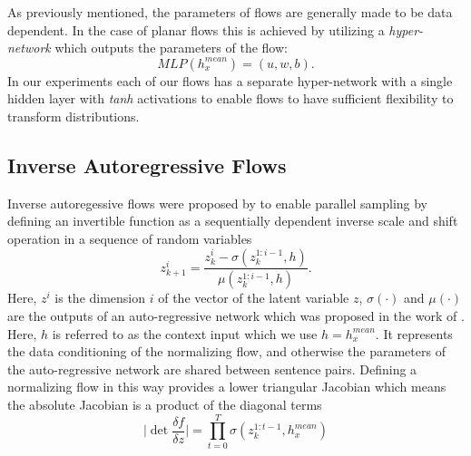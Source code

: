 

As previously mentioned, the parameters of flows are generally made to be data dependent. In the case of planar flows this is achieved by utilizing a \textit{hyper-network} \cite{ha2016hypernets} which outputs the parameters of the flow:
 \begin{equation}
 MLP(h^{mean}_{x}) = (u, w, b).
 \end{equation}
In our experiments each of our flows has a separate hyper-network with a single hidden layer with \textit{tanh} activations to enable flows to have sufficient flexibility to transform distributions.
 
\subsection{Inverse Autoregressive Flows}
Inverse autoregessive flows were proposed by \citet{kingma2016IAF} to enable parallel sampling by defining an invertible function as a sequentially dependent  inverse scale and shift  operation in a sequence of random variables
\begin{equation}
z_{k+1}^{i} = \frac{z_{k}^{i} - \sigma(z_{k}^{1:i-1}, h)}{\mu(z_{k}^{1:i-1}, h)}.
\end{equation}
Here, $z^{i}$ is the dimension $i$ of the vector of the latent variable $z$, $\sigma(\cdot)$ and $\mu(\cdot)$ are the outputs of an auto-regressive network which was proposed in the work of \citet{MADE2015germain}. Here, $h$ is referred to as the context input which we use $h= h^{mean}_{x}$. It represents the data conditioning of the normalizing flow, and otherwise the parameters of the auto-regressive network are shared between sentence pairs. Defining a normalizing flow in this way provides a lower triangular Jacobian which means the absolute Jacobian is a product of the diagonal terms 
\begin{equation}
\bigg| \det \frac{\delta f}{\delta z} \bigg| = \prod_{t=0}^{T} \sigma(z_{k}^{1:t-1}, h^{mean}_{x})
\end{equation}

